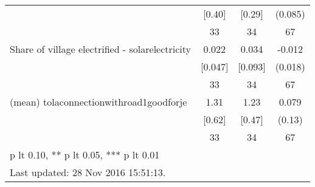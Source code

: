\begin{table}[htbp]
\begin{tabular*}{0.9\hsize}{@{\hskip\tabcolsep\extracolsep\fill}l*{1}{ccc}}
                                &   [0.40]&   [0.29]&  (0.085)         \\
                                &       33&       34&       67         \\
Share of village electrified - solarelectricity&    0.022&    0.034&   -0.012         \\
                                &  [0.047]&  [0.093]&  (0.018)         \\
                                &       33&       34&       67         \\
(mean) tolaconnectionwithroad1goodforje&     1.31&     1.23&    0.079         \\
                                &   [0.62]&   [0.47]&   (0.13)         \\
                                &       33&       34&       67         \\
\bottomrule
\multicolumn{4}{l}{\footnotesize * p lt 0.10, ** p lt 0.05, *** p lt 0.01}\\
\multicolumn{4}{l}{\footnotesize Last updated: 28 Nov 2016 15:51:13.}\\
\end{tabular*}
\end{table}
